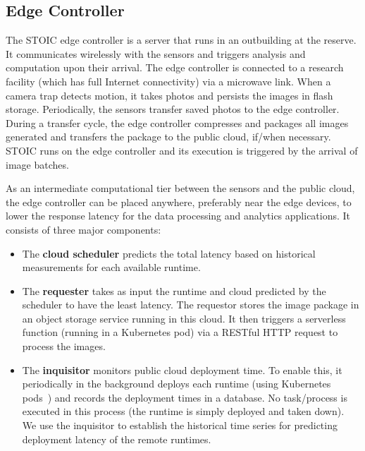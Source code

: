 \subsection{Edge Controller} 

The STOIC edge controller is a server that runs in an
outbuilding at the reserve. It communicates wirelessly with the sensors and
triggers analysis and computation upon their arrival. The edge controller is
connected to a research facility (which has full Internet connectivity) 
via a microwave link. When a camera trap detects
motion, it takes photos and persists the images in flash storage.
Periodically, the sensors transfer saved photos to the edge controller. 
During a transfer cycle, the edge controller compresses and
packages all images generated
and transfers the package to the public cloud, if/when necessary.
STOIC runs on the edge controller and its execution
is triggered by the arrival of image batches. 

As an intermediate computational tier between the sensors and the public
cloud, the edge controller can be placed anywhere, preferably near the edge
devices, to lower the response latency for the data processing and analytics
applications. It consists of three major components: 
\begin{itemize}
\item The \textbf{cloud
scheduler} predicts the total latency based on historical measurements
for each available runtime. 
\item The \textbf{requester} takes as input the runtime and cloud predicted
by the scheduler to have the least latency.  The requestor stores the image 
package in an object storage service running in this cloud. It then 
triggers a serverless function (running in a Kubernetes pod) via a
RESTful HTTP request to process the images.
\item The \textbf{inquisitor} monitors public cloud
deployment time.  To enable this, it periodically in the background
deploys each runtime
(using Kubernetes pods~\cite{ref:pods}) and records the deployment 
times in a database. No task/process is executed in this process (the
runtime is simply deployed and taken down). 
We use the inquisitor to establish the historical time 
series for predicting deployment latency of the remote runtimes.
\end{itemize}

